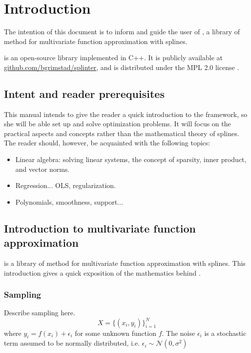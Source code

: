 \section{Introduction \splinter{}}
\label{sec:introduction}
The intention of this document is to inform and guide the user of \splinter{}, a library of method for multivariate function approximation with splines.

\splinter{} is an open-source library implemented in C++. It is publicly available at \url{github.com/bgrimstad/splinter}, and is distributed under the MPL 2.0 license \cite{splinter}.

\subsection{Intent and reader prerequisites}
This manual intends to give the reader a quick introduction to the \splinter{} framework, so she will be able set up and solve optimization problems. It will focus on the practical aspects and concepts rather than the mathematical theory of splines. The reader should, however, be acquainted with the following topics:
\begin{itemize}
\item Linear algebra: solving linear systems, the concept of sparsity, inner product, and vector norms.
\item Regression... OLS, regularization.
\item Polynomials, smoothness, support...
\end{itemize}

\subsection{Introduction to multivariate function approximation}
\splinter{} is a library of method for multivariate function approximation with splines. This introduction gives a quick exposition of the mathematics behind \splinter{}.

\subsubsection{Sampling}
\label{sec:sampling}
Describe sampling here.
\begin{equation}
X = \{ (x_i, y_i) \}_{i=1}^{N}
\end{equation}
where $y_i = f(x_i) + \epsilon_i$ for some unknown function $f$. The noise $\epsilon_i$ is a stochastic term assumed to be normally distributed, i.e. $\epsilon_i \sim \mathcal{N}(0, \sigma^2)$


